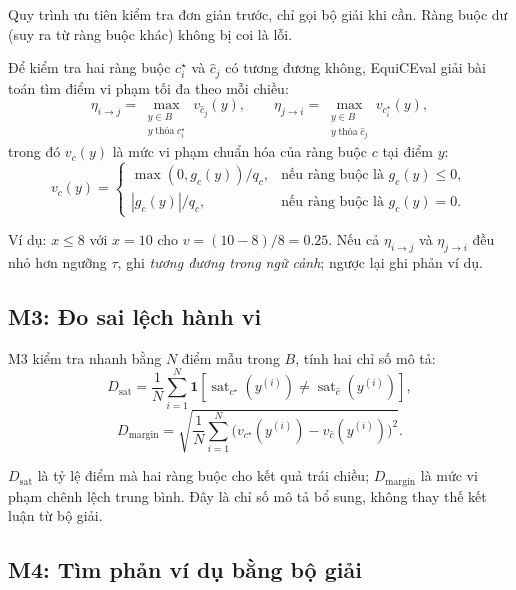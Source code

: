 \documentclass[11pt,a4paper]{article}
\theoremstyle{plain}
\theoremstyle{definition}
\theoremstyle{remark}
\newcommand{\method}{\textsf{EquiCEval}\xspace}
\begin{document}
Quy trình ưu tiên kiểm tra đơn giản trước, chỉ gọi bộ giải khi cần.
Ràng buộc dư (suy ra từ ràng buộc khác) không bị coi là lỗi.

Để kiểm tra hai ràng buộc $c_i^\star$ và $\hat{c}_j$ có tương đương không,
\method giải bài toán tìm điểm vi phạm tối đa theo mỗi chiều:
\begin{equation}
  \label{eq:eta}
  \eta_{i \to j} = \max_{\substack{y \in B \\ y\;\text{thỏa}\;c_i^\star}}
  v_{\hat{c}_j}(y), \qquad
  \eta_{j \to i} = \max_{\substack{y \in B \\ y\;\text{thỏa}\;\hat{c}_j}}
  v_{c_i^\star}(y),
\end{equation}
trong đó $v_c(y)$ là mức vi phạm chuẩn hóa của ràng buộc $c$ tại điểm $y$:
\begin{equation}
  v_c(y) =
  \begin{cases}
    \max(0, g_c(y)) / q_c, & \text{nếu ràng buộc là } g_c(y) \leq 0, \\
    |g_c(y)| / q_c,        & \text{nếu ràng buộc là } g_c(y) = 0.
  \end{cases}
\end{equation}

Ví dụ: $x \leq 8$ với $x = 10$ cho $v = (10 - 8)/8 = 0.25$.
Nếu cả $\eta_{i \to j}$ và $\eta_{j \to i}$ đều nhỏ hơn ngưỡng $\tau$,
ghi \emph{tương đương trong ngữ cảnh}; ngược lại ghi phản ví dụ.

\subsection{M3: Đo sai lệch hành vi}

M3 kiểm tra nhanh bằng $N$ điểm mẫu trong $B$, tính hai chỉ số mô tả:
\begin{equation}
  D_{\mathrm{sat}} =
  \frac{1}{N}\sum_{i=1}^{N}
  \mathbf{1}\!\left[\operatorname{sat}_{c^\star}(y^{(i)})
  \neq \operatorname{sat}_{\hat{c}}(y^{(i)})\right],
\end{equation}
\begin{equation}
  D_{\mathrm{margin}} =
  \sqrt{\frac{1}{N}\sum_{i=1}^{N}
  \bigl(v_{c^\star}(y^{(i)}) - v_{\hat{c}}(y^{(i)})\bigr)^2}.
\end{equation}

$D_{\mathrm{sat}}$ là tỷ lệ điểm mà hai ràng buộc cho kết quả trái chiều;
$D_{\mathrm{margin}}$ là mức vi phạm chênh lệch trung bình.
Đây là chỉ số mô tả bổ sung, không thay thế kết luận từ bộ giải.

\subsection{M4: Tìm phản ví dụ bằng bộ giải}
\end{document}
